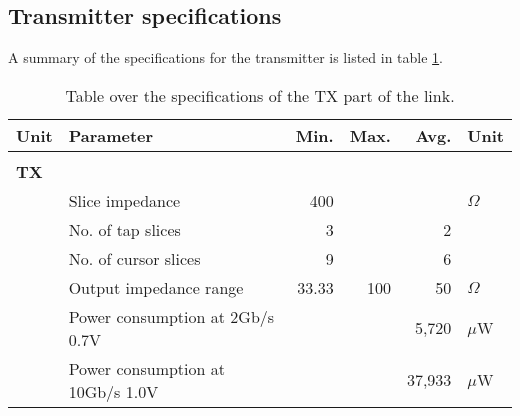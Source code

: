 \subsection{Transmitter specifications }

A summary of the specifications for the transmitter is listed in table \ref{tab:tx_specifications}.

\begin{table}[H]
  \centering
  \begin{tabular}{l l|r|r|r|l}
 Unit  & Parameter & Min. & Max. & Avg. & Unit \\
    \hline
    & & & & &\\
\textbf{TX} & & & & &\\
&	Slice impedance & 400 &  &  & $\Omega$\\
&	No. of tap slices & 3 &  & 2 & \\
&	No. of cursor slices & 9 &  & 6 & \\
&	Output impedance range & 33.33 & 100 & 50 & $\Omega$\\
&	Power consumption at 2Gb/s 0.7V &  &  & 5,720 & $\mu$W\\
&	Power consumption at 10Gb/s 1.0V &  &  & 37,933 & $\mu$W\\
  \end{tabular}
  \caption{Table over the specifications of the TX part of the link.}
  \label{tab:tx_specifications}
\end{table}